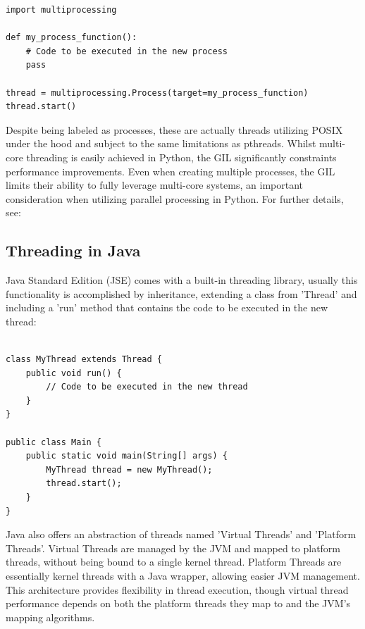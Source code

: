 \documentclass[12pt,a4paper]{article}
\begin{document}
\begin{verbatim}
import multiprocessing

def my_process_function():
    # Code to be executed in the new process
    pass

thread = multiprocessing.Process(target=my_process_function)
thread.start()
\end{verbatim}

Despite being labeled as processes, these are actually threads utilizing POSIX under the hood\parencite{PythonMultiprocessing} and subject to the same limitations as pthreads. Whilst multi-core threading is easily achieved in Python, the GIL significantly constraints performance improvements\parencite{PythonGIL}. Even when creating multiple processes, the GIL limits their ability to fully leverage multi-core systems, an important consideration when utilizing parallel processing in Python. For further details, see: 

\subsection{Threading in Java}

Java Standard Edition (JSE) comes with a built-in threading library\parencite{JavaThreadClass}, usually this functionality is accomplished by inheritance, extending a class from 'Thread' and including a 'run' method that contains the code to be executed in the new thread:

\begin{verbatim}

class MyThread extends Thread {
    public void run() {
        // Code to be executed in the new thread
    }
}

public class Main {
    public static void main(String[] args) {
        MyThread thread = new MyThread();
        thread.start();
    }
}
\end{verbatim}

Java also offers an abstraction of threads named 'Virtual Threads' and 'Platform Threads'\parencite{JavaVirtualThreads}. Virtual Threads are managed by the JVM and mapped to platform threads, without being bound to a single kernel thread. Platform Threads are essentially kernel threads with a Java wrapper, allowing easier JVM management. This architecture provides flexibility in thread execution, though virtual thread performance depends on both the platform threads they map to and the JVM's mapping algorithms.
\end{document}
